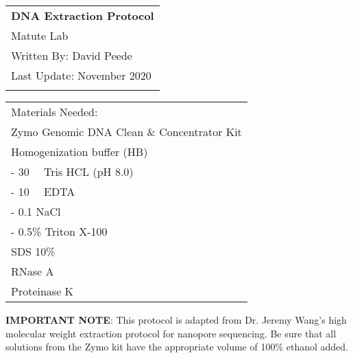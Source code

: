 \documentclass[a4paper,12pt]{article}
\begin{document}
\thispagestyle{empty} 

\begin{tabular}{p{15.5cm}} %
{\large \bf DNA Extraction Protocol} \\
Matute Lab \\ Written By: David Peede  \\ Last Update: November 2020\\
\hline %
\\
\end{tabular} %

\vspace*{0.3cm} %

\begin{tabular}{p{15.5cm}} %
	{\Large Materials Needed:} 
	\vspace{2mm}
	\\ {Zymo Genomic DNA Clean \& Concentrator Kit} \\ {Homogenization buffer (HB)} \\ {- \SI{30}{\milli\molar} Tris HCL (pH 8.0)} \\ {- \SI{10}{\milli\molar} EDTA} \\ {- \SI{0.1}{\molar} NaCl} \\ {- 0.5\% Triton X-100} \\ {SDS 10\%} \\ {RNase A} \\ {Proteinase K}
		
\end{tabular}

\vspace{0.4cm}

\textbf{IMPORTANT NOTE}: This protocol is adapted from Dr. Jeremy Wang's high molecular weight extraction protocol for nanopore sequencing. Be sure that all solutions from the Zymo kit have the appropriate volume of 100\% ethanol added. 
\end{document}
